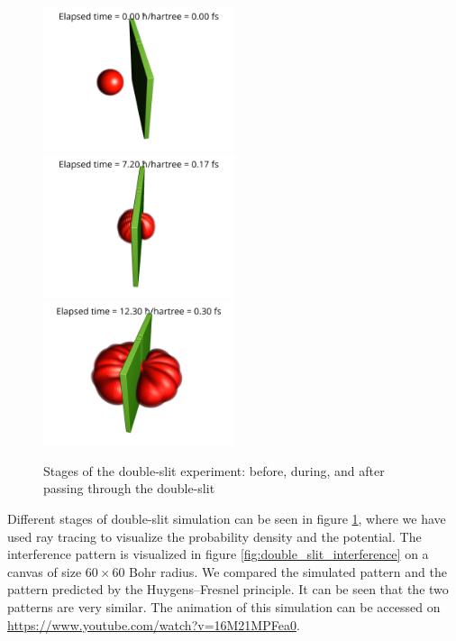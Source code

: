 \begin{figure}
	\begin{center}
		\includegraphics[width=0.5\textwidth]{figures/double_slit_01.png}
		\includegraphics[width=0.5\textwidth]{figures/double_slit_02.png}
		\includegraphics[width=0.5\textwidth]{figures/double_slit_03.png}
		\caption{Stages of the double-slit experiment: before, during, and after passing through the double-slit}
		\label{fig:double_slit_stages}
	\end{center}
\end{figure}
Different stages of double-slit simulation can be seen in figure \ref{fig:double_slit_stages}, where we have used ray tracing to visualize the probability density and the potential.
The interference pattern is visualized in figure \ref{fig:double_slit_interference} on a canvas of size $60 \times 60$ Bohr radius.
We compared the simulated pattern and the pattern predicted by the Huygens–Fresnel principle.
It can be seen that the two patterns are very similar.
The animation of this simulation can be accessed on \url{https://www.youtube.com/watch?v=16M21MPFea0}.
